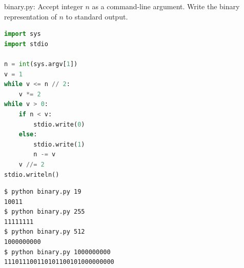 \documentclass[8pt,a4paper,compress]{beamer}
\begin{document}
\begin{frame}[fragile]
\pause

\begin{framed}
\tiny binary.py: Accept integer $n$ as a command-line argument. Write the binary representation of $n$ to standard output.
\end{framed}

\begin{minipage}{150pt}
\begin{lstlisting}[language=Python]
import sys
import stdio

n = int(sys.argv[1])
v = 1
while v <= n // 2:
    v *= 2
while v > 0:
    if n < v:
        stdio.write(0)
    else:
        stdio.write(1)
        n -= v
    v //= 2
stdio.writeln()
\end{lstlisting}

\end{minipage}%
\begin{minipage}{150pt}
\hfill {}
\end{minipage}

\pause

\begin{lstlisting}[language={}]
$ python binary.py 19
10011
$ python binary.py 255
11111111
$ python binary.py 512
1000000000
$ python binary.py 1000000000
111011100110101100101000000000
\end{lstlisting}
\end{frame}
\end{document}
